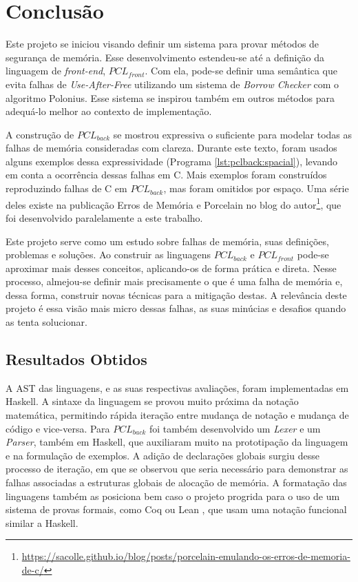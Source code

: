 \chapter{Conclusão}
\label{chap7}

Este projeto se iniciou visando definir um sistema para provar métodos de segurança de memória. Esse desenvolvimento estendeu-se até a definição da linguagem de \emph{front-end}, $PCL_{front}$. Com ela, pode-se definir uma semântica que evita falhas de \emph{Use-After-Free} utilizando um sistema de \emph{Borrow Checker} com o algoritmo Polonius. Esse sistema se inspirou também em outros métodos para adequá-lo melhor ao contexto de implementação.

A construção de $PCL_{back}$ se mostrou expressiva o suficiente para modelar todas as falhas de memória consideradas com clareza. Durante este texto, foram usados alguns exemplos dessa expressividade (Programa \ref{lst:pclback:spacial}), levando em conta a ocorrência dessas falhas em C. Mais exemplos foram construídos reproduzindo falhas de C em $PCL_{back}$, mas foram omitidos por espaço. Uma série deles existe na publicação Erros de Memória e Porcelain no blog do autor\footnote{\url{https://sacolle.github.io/blog/posts/porcelain-emulando-os-erros-de-memoria-de-c/}}, que foi desenvolvido paralelamente a este trabalho.

Este projeto serve como um estudo sobre falhas de memória, suas definições, problemas e soluções. Ao construir as linguagens $PCL_{back}$ e $PCL_{front}$ pode-se aproximar mais desses conceitos, aplicando-os de forma prática e direta. Nesse processo, almejou-se definir mais precisamente o que é uma falha de memória e, dessa forma, construir novas técnicas para a mitigação destas. A relevância deste projeto é essa visão mais micro dessas falhas, as suas minúcias e desafios quando as tenta solucionar.

\section{Resultados Obtidos}

A AST das linguagens, e as suas respectivas avaliações, foram implementadas em Haskell. A sintaxe da linguagem se provou muito próxima da notação matemática, permitindo rápida iteração entre mudança de notação e mudança de código e vice-versa. Para $PCL_{back}$ foi também desenvolvido um \emph{Lexer} e um \emph{Parser}, também em Haskell, que auxiliaram muito na prototipação da linguagem e na formulação de exemplos. A adição de declarações globais surgiu desse processo de iteração, em que se observou que seria necessário para demonstrar as falhas associadas a estruturas globais de alocação de memória. A formatação das linguagens também as posiciona bem caso o projeto progrida para o uso de um sistema de provas formais, como Coq \cite{COQ} ou Lean \cite{LEAN4}, que usam uma notação funcional similar a Haskell.
